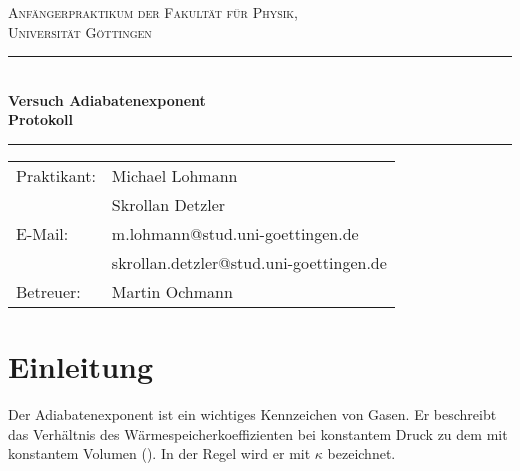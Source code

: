 \documentclass[12pt,a4paper,titlepage,headinclude,bibtotoc]{scrartcl}
\begin{document}
\begin{titlepage}
\centering
\textsc{\Large Anfängerpraktikum der Fakultät für
  Physik,\\[1.5ex] Universität Göttingen}

\vspace*{4.2cm}

\rule{\textwidth}{1pt}\\[0.5cm]
{\huge \bfseries
  Versuch Adiabatenexponent\\[1.5ex]
  Protokoll}\\[0.5cm]
\rule{\textwidth}{1pt}

\vspace*{3cm}

\begin{Large}
\begin{tabular}{ll}
Praktikant: &  Michael Lohmann\\
& Skrollan Detzler\\
E-Mail: & m.lohmann@stud.uni-goettingen.de\\
 & skrollan.detzler@stud.uni-goettingen.de\\
Betreuer: & Martin Ochmann\\
\end{tabular}
\end{Large}

\vspace*{0.8cm}

\begin{Large}
\end{Large}

\end{titlepage}

\tableofcontents

\newpage

\section{Einleitung}
\label{sec:einleitung}
Der Adiabatenexponent ist ein wichtiges Kennzeichen von Gasen.
Er beschreibt das Verhältnis des Wärmespeicherkoeffizienten bei konstantem Druck zu dem mit konstantem Volumen (\cite[S. 263]{gerthsen}).
In der Regel wird er mit $\kappa$ bezeichnet.
\end{document}

